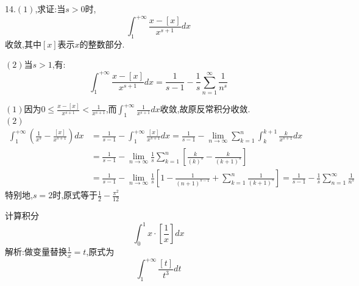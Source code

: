 \documentclass{ctexart}
\begin{document}
\begin{tcolorbox}[title = {综合性问题},colbacktitle=red!25!white,colback=white,arc = 2mm, outer arc = 2mm,fonttitle = \itshape, fontupper = \itshape, fontlower = \itshape]
	14.$\left(1\right) $,求证:当$s > 0$时,$$\displaystyle{\int_{1}^{+\infty}\frac{x-[x]}{x^{s+1}}dx}$$收敛,其中$[x]$表示$x$的整数部分.
	
	$\left(2\right) $当$s>1$,有:
	$$\int_{1}^{+\infty}\frac{x-[x]}{x^{s+1}}dx=\frac{1}{s-1}-\frac{1}{s}\sum_{n=1}^{\infty}\frac{1}{n^{s}}$$
	\begin{tcolorbox}[colback=white,arc = 1mm, outer arc = 1mm,fonttitle = \itshape, fontupper = \itshape, fontlower = \itshape]
		$\left(1\right) $因为$\displaystyle{0 \le \frac{x-[x]}{x^{s+1}} < \frac{1}{x^{s+1}} }$,而$\displaystyle{\int_{1}^{+\infty}\frac{1}{x^{s+1}}dx}$收敛,故原反常积分收敛.\\
		$\left(2\right) $ 
		$$
		\begin{aligned}
			\int_{1}^{+\infty}\left( \frac{1}{x^{s}}-\frac{[x]}{x^{s+1}}\right)dx &=\frac{1}{s-1}-\int_{1}^{+\infty}\frac{[x]}{x^{s+1}}dx
			= \frac{1}{s-1}-\lim_{n \to \infty }\sum_{k=1}^{n}\int_{k}^{k+1}\frac{k}{x^{s+1}}dx \\
			&=\frac{1}{s-1}-\lim_{n \to \infty }\frac{1}{s}\sum_{k=1}^{n} \left [\frac{k}{(k)^{s}}-\frac{k}{(k+1)^{s}}\right ] \\ 
			&=\frac{1}{s-1}-\lim_{n \to \infty }\frac{1}{s} \left [1-\frac{1}{(n+1)^{s-1}}+\sum_{k=1}^{n}\frac{1}{(k+1)^{s}} \right]
			=\frac{1}{s-1}-\frac{1}{s}\sum_{n=1}^{\infty}\frac{1}{n^{s}}
		\end{aligned}
		$$
		特别地,$s=2$时,原式等于$\displaystyle{\frac{1}{2}-\frac{\pi^{2}}{12}}$
		
	\end{tcolorbox}
\begin{tcolorbox}[title =补充,colbacktitle=blue!85!white,colback=white,arc = 3mm, outer arc = 3mm,fonttitle = \itshape, fontupper = \itshape, fontlower = \itshape]
	 计算积分$$\int_{0}^{1}x 
	 \cdot \left[\frac{1}{x}\right]dx$$
	 解析:做变量替换$\displaystyle{\frac{1}{x}=t}$,原式为$$\int_{1}^{+\infty}\frac{\left[t\right]}{t^{3}}dt$$
\end{tcolorbox}	
\end{tcolorbox}	
\end{document}
